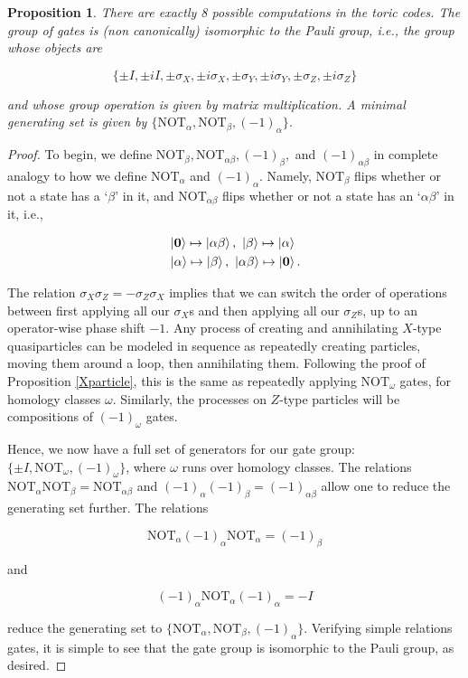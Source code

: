 \documentclass{article}
\newtheorem{proposition}{Proposition}[section]
\theoremstyle{definition}
\numberwithin{figure}{section}
\begin{document}
\begin{proposition}\label{Yparticle} There are exactly 8 possible computations in the toric codes. The group of gates is (non canonically) isomorphic to the Pauli group, i.e., the group whose objects are

$$\{\pm I, \pm iI, \pm \sigma_X, \pm i \sigma_X, \pm \sigma_Y, \pm i\sigma_Y, \pm \sigma_Z, \pm i \sigma_Z\}$$

and whose group operation is given by matrix multiplication. A minimal generating set is given by $\{\text{NOT}_{\alpha},\text{NOT}_{\beta},(-1)_{\alpha}\}$.
\end{proposition}
\begin{proof} To begin, we define $\text{NOT}_{\beta},\text{NOT}_{\alpha\beta},(-1)_{\beta},$ and $(-1)_{\alpha\beta}$ in complete analogy to how we define $\text{NOT}_{\alpha}$ and $(-1)_{\alpha}$. Namely, $\text{NOT}_{\beta}$ flips whether or not a state has a `$\beta$' in it, and $\text{NOT}_{\alpha\beta}$ flips whether or not a state has an `$\alpha\beta$' in it, i.e.,

\begin{align*}
&\left|\bold{0}\right> \mapsto \left|\alpha\beta\right>,\,\,  \left|\beta\right> \mapsto \left|\alpha\right> \\
&\left|\alpha\right> \mapsto \left|\beta\right>,\,\, \left|\alpha\beta\right> \mapsto \left|\bold{0}\right>.
\end{align*}

The relation $\sigma_X\sigma_Z=-\sigma_Z\sigma_X$ implies that we can switch the order of operations between first applying all our $\sigma_X$s and then applying all our $\sigma_Z$s, up to an operator-wise phase shift $-1$. Any process of creating and annihilating $X$-type quasiparticles can be modeled in sequence as repeatedly creating particles, moving them around a loop, then annihilating them. Following the proof of Proposition \ref{Xparticle}, this is the same as repeatedly applying $\text{NOT}_{\omega}$ gates, for homology classes $\omega$. Similarly, the processes on $Z$-type particles will be compositions of $(-1)_{\omega}$ gates.

Hence, we now have a full set of generators for our gate group: $\{\pm I, \text{NOT}_{\omega}, (-1)_{\omega}\}$, where $\omega$ runs over homology classes. The relations $\text{NOT}_{\alpha}\text{NOT}_{\beta}=\text{NOT}_{\alpha\beta}$ and $(-1)_{\alpha}(-1)_{\beta}=(-1)_{\alpha\beta}$ allow one to reduce the generating set further. The relations

$$\text{NOT}_{\alpha}(-1)_{\alpha}\text{NOT}_{\alpha}=(-1)_{\beta}$$

and

$$(-1)_{\alpha}\text{NOT}_{\alpha}(-1)_{\alpha}=-I$$

reduce the generating set to $\{\text{NOT}_{\alpha},\text{NOT}_{\beta},(-1)_{\alpha}\}$. Verifying simple relations gates, it is simple to see that the gate group is isomorphic to the Pauli group, as desired.


\end{proof}
\end{document}
